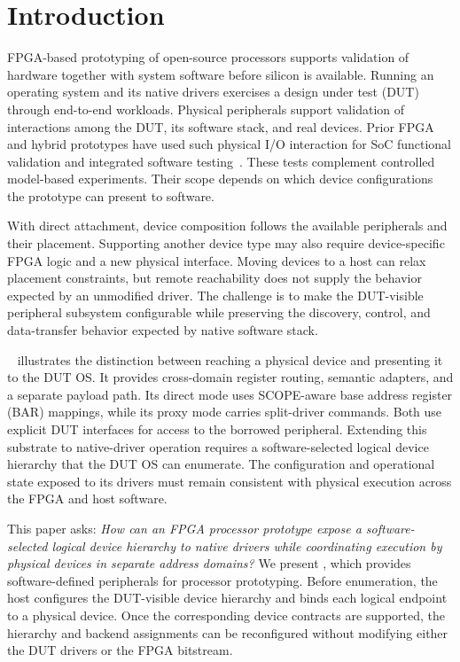 \section{Introduction}
\label{sec:intro}

FPGA-based prototyping of open-source processors supports validation of
hardware together with system software before silicon is available. Running
an operating system and its native drivers exercises a design
under test (DUT) through end-to-end workloads. Physical peripherals support
validation of interactions among the DUT, its software stack, and real devices.
Prior FPGA and hybrid prototypes have used such physical I/O interaction for
SoC functional validation and integrated software
testing~\cite{feng2018accelerator,callanan2011prototyping}.
These tests complement controlled model-based experiments. Their scope
depends on which device configurations the prototype can present to software.

With direct attachment, device composition follows the available peripherals
and their placement. Supporting another device type may also require
device-specific FPGA logic and a new physical interface. Moving devices to a host can relax
placement constraints, but remote reachability does not supply the
behavior expected by an unmodified driver. The challenge is to make the
DUT-visible peripheral subsystem configurable while preserving the discovery,
control, and data-transfer behavior expected by native software stack.

\sysprevious~\cite{scope2026fpt} illustrates the distinction between reaching
a physical device and presenting it to the DUT OS. It provides cross-domain
register routing, semantic adapters, and a separate payload path. Its direct
mode uses SCOPE-aware base address register (BAR) mappings, while its proxy
mode carries split-driver
commands. Both use explicit DUT interfaces for access to the borrowed
peripheral. Extending this substrate to native-driver operation requires a
software-selected logical device hierarchy that the DUT OS can enumerate.
The configuration and operational state exposed to its drivers must remain consistent
with physical execution across the FPGA and host software.

This paper asks: \emph{How can an FPGA processor prototype expose a
software-selected logical device hierarchy to native drivers while coordinating
execution by physical devices in separate address domains?}
We present \sys, which provides software-defined peripherals for processor
prototyping. Before enumeration, the host configures the DUT-visible device
hierarchy and binds each logical endpoint to a physical device.
Once the corresponding device contracts are supported,
the hierarchy and backend assignments can be reconfigured without modifying either the DUT drivers or the FPGA bitstream.

